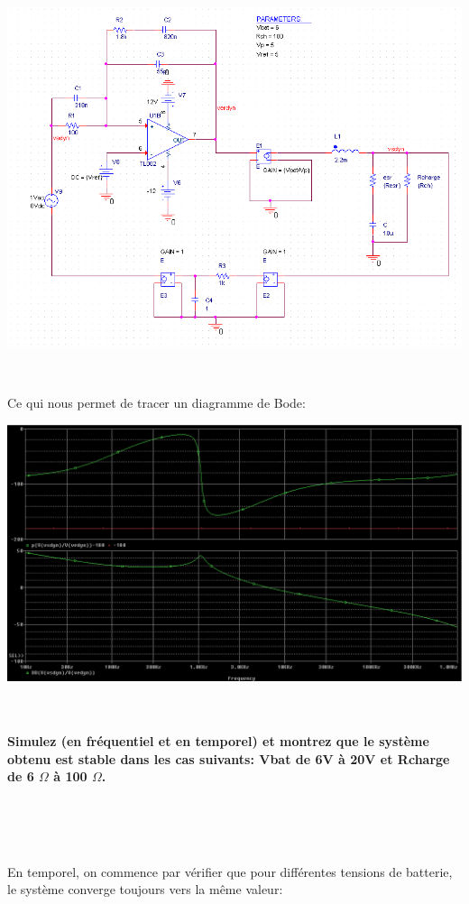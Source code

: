 \documentclass{article}
\begin{document}
\includegraphics[width=\linewidth]{circuit_freq.png}

~

Ce qui nous permet de tracer un diagramme de Bode:

\includegraphics[width=\linewidth]{MP_Vbat_6V.png}

~

\paragraph{Simulez (en fréquentiel et en temporel) et montrez que le système obtenu est stable dans les cas suivants: Vbat de 6V à 20V et Rcharge de 6 $\Omega$ à 100 $\Omega$.}

~

~

En temporel, on commence par vérifier que pour différentes tensions de batterie, le système converge toujours vers la même valeur:
\end{document}
